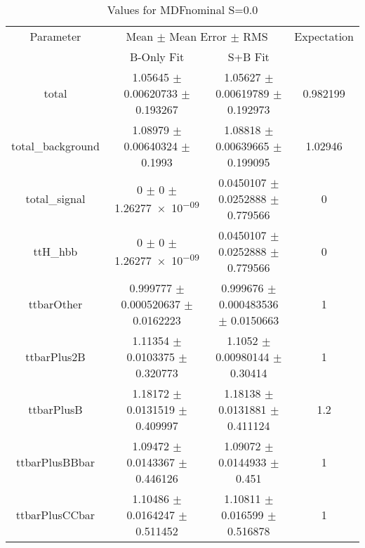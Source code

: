 \begin{table}
\centering
\caption{Values for MDFnominal S=0.0}
\begin{tabular}{cccc}
\toprule
Parameter & \multicolumn{2}{c}{Mean $\pm$ Mean Error $\pm$ RMS} & Expectation\\
 & B-Only Fit & S+B Fit & \\
\midrule
total & \num{1.05645} $\pm$ \num{0.00620733} $\pm$ \num{0.193267} & \num{1.05627} $\pm$ \num{0.00619789} $\pm$ \num{0.192973} & \num{0.982199}\\
total\_background & \num{1.08979} $\pm$ \num{0.00640324} $\pm$ \num{0.1993} & \num{1.08818} $\pm$ \num{0.00639665} $\pm$ \num{0.199095} & \num{1.02946}\\
total\_signal & \num{0} $\pm$ \num{0} $\pm$ \num{1.26277e-09} & \num{0.0450107} $\pm$ \num{0.0252888} $\pm$ \num{0.779566} & \num{0}\\
ttH\_hbb & \num{0} $\pm$ \num{0} $\pm$ \num{1.26277e-09} & \num{0.0450107} $\pm$ \num{0.0252888} $\pm$ \num{0.779566} & \num{0}\\
ttbarOther & \num{0.999777} $\pm$ \num{0.000520637} $\pm$ \num{0.0162223} & \num{0.999676} $\pm$ \num{0.000483536} $\pm$ \num{0.0150663} & \num{1}\\
ttbarPlus2B & \num{1.11354} $\pm$ \num{0.0103375} $\pm$ \num{0.320773} & \num{1.1052} $\pm$ \num{0.00980144} $\pm$ \num{0.30414} & \num{1}\\
ttbarPlusB & \num{1.18172} $\pm$ \num{0.0131519} $\pm$ \num{0.409997} & \num{1.18138} $\pm$ \num{0.0131881} $\pm$ \num{0.411124} & \num{1.2}\\
ttbarPlusBBbar & \num{1.09472} $\pm$ \num{0.0143367} $\pm$ \num{0.446126} & \num{1.09072} $\pm$ \num{0.0144933} $\pm$ \num{0.451} & \num{1}\\
ttbarPlusCCbar & \num{1.10486} $\pm$ \num{0.0164247} $\pm$ \num{0.511452} & \num{1.10811} $\pm$ \num{0.016599} $\pm$ \num{0.516878} & \num{1}\\
\bottomrule
\end{tabular}
\end{table}